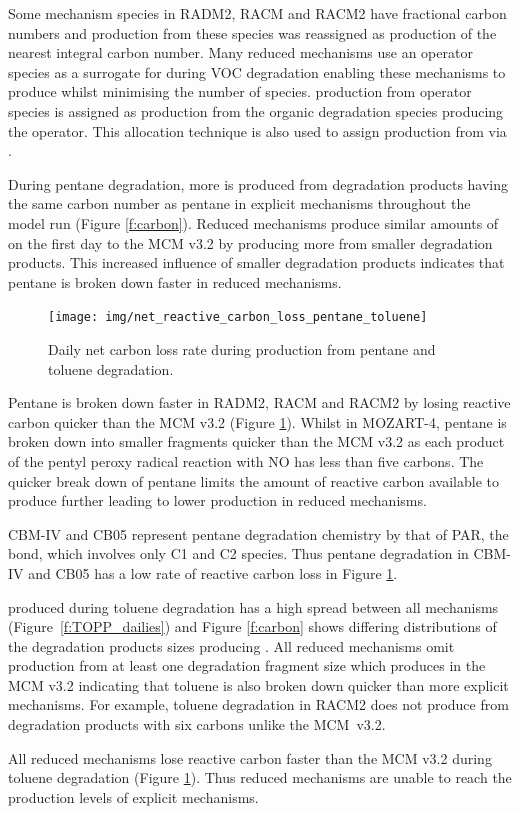 Some mechanism species in RADM2, RACM and RACM2 have fractional carbon numbers \citep{Stockwell:1990, Stockwell:1997, Goliff:2013} and  production from these species was reassigned as  production of the nearest integral carbon number.  
Many reduced mechanisms use an operator species as a surrogate for  during VOC degradation enabling these mechanisms to produce  whilst minimising the number of  species.
 production from operator species is assigned as  production from the organic degradation species producing the operator.
This allocation technique is also used to assign  production from  via .

During pentane degradation, more  is produced from degradation products having the same carbon number as pentane in explicit mechanisms throughout the model run (Figure \ref{f:carbon}).
Reduced mechanisms produce similar amounts of  on the first day to the MCM v3.2 by producing more  from smaller degradation products.
This increased influence of smaller degradation products indicates that pentane is broken down faster in reduced mechanisms.

\begin{figure}
    \centering
    \texttt{[image: img/net\_reactive\_carbon\_loss\_pentane\_toluene]}
    \vspace{0mm}
    \caption{Daily net carbon loss rate during  production from pentane and toluene degradation.}
    \vspace{-4mm}
    \label{f:net_carbon_loss}
\end{figure}

Pentane is broken down faster in RADM2, RACM and RACM2 by losing reactive carbon quicker than the MCM v3.2 (Figure \ref{f:net_carbon_loss}).
Whilst in MOZART-4, pentane is broken down into smaller fragments quicker than the MCM v3.2 as each product of the pentyl peroxy radical reaction with NO has less than five carbons.
The quicker break down of pentane limits the amount of reactive carbon available to produce further  leading to lower  production in reduced mechanisms.

CBM-IV and CB05 represent pentane degradation chemistry by that of PAR, the  bond, which involves only C1 and C2 species.
Thus pentane degradation in CBM-IV and CB05 has a low rate of reactive carbon loss in Figure \ref{f:net_carbon_loss}.

 produced during toluene degradation has a high spread between all mechanisms \mbox{(Figure \ref{f:TOPP_dailies})} and Figure \ref{f:carbon} shows differing distributions of the degradation products sizes producing .
All reduced mechanisms omit  production from at least one degradation fragment size which produces  in the MCM v3.2 indicating that toluene is also broken down quicker than more explicit mechanisms.
For example, toluene degradation in RACM2 does not produce  from degradation products with six carbons unlike the \mbox{MCM v3.2}.

All reduced mechanisms lose reactive carbon faster than the MCM v3.2 during toluene degradation (Figure \ref{f:net_carbon_loss}).
Thus reduced mechanisms are unable to reach the  production levels of explicit mechanisms.
